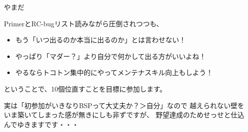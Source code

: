 \begin{prework}{やまだ}

PrimerとRC-bugリスト読みながら圧倒されつつも、

\begin{itemize}
\item もう「いつ出るのか本当に出るのか」とは言わせない！
\item やっぱり「マダー？」より自分で何かして出る方がいいよね！
\item やるならトコトン集中的にやってメンテナスキル向上もしよう！
\end{itemize}

ということで、10個位直すことを目標に参加します。

実は「初参加がいきなりBSPって大丈夫か？＞自分」なので
越えられない壁をいま築いてしまった感が無きにしも非ずですが、
野望達成のためせっせと仕込んでゆきますです・・・

\end{prework}

